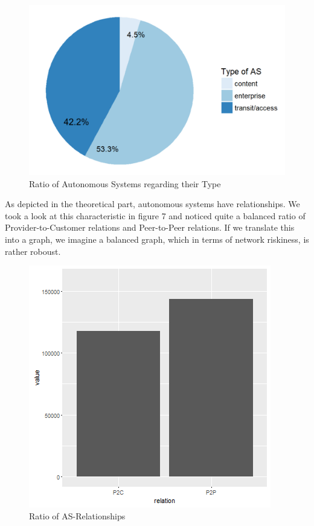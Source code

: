\documentclass[conference, 11pt]{IEEEtran}
\begin{document}
\vspace{0.5cm}
\begin{figure}[htbp]
\centerline{\includegraphics[scale=0.4]{Graphics/typeofAS.PNG}}
\caption{Ratio of Autonomous Systems regarding their Type }
\label{fig}
\end{figure}
\vspace{0.5cm}

As depicted in the theoretical part, autonomous systems have relationships. We took a look at this characteristic in figure 7 and noticed quite a balanced ratio of Provider-to-Customer relations and Peer-to-Peer relations. If we translate this into a graph, we imagine a balanced graph, which in terms of network riskiness, is rather roboust. 

\vspace{0.5cm}
\begin{figure}[htbp]
\centerline{\includegraphics[scale=0.45]{Graphics/relationspeerandprovider.png}}
\caption{Ratio of AS-Relationships }
\label{fig}
\end{figure}
\vspace{0.5cm}
\end{document}
